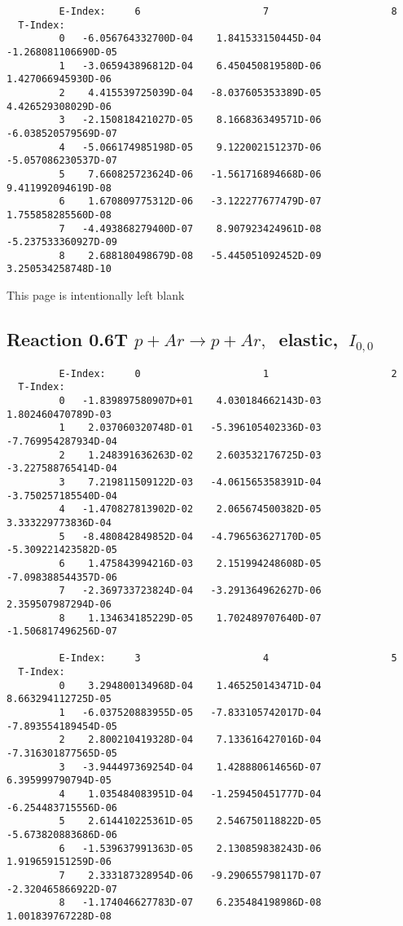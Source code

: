 \documentclass[12pt,dvipdfmx]{article}
\begin{document}
{\begin{small}
\begin{verbatim}
         E-Index:     6                     7                     8
  T-Index:
         0   -6.056764332700D-04    1.841533150445D-04   -1.268081106690D-05
         1   -3.065943896812D-04    6.450450819580D-06    1.427066945930D-06
         2    4.415539725039D-04   -8.037605353389D-05    4.426529308029D-06
         3   -2.150818421027D-05    8.166836349571D-06   -6.038520579569D-07
         4   -5.066174985198D-05    9.122002151237D-06   -5.057086230537D-07
         5    7.660825723624D-06   -1.561716894668D-06    9.411992094619D-08
         6    1.670809775312D-06   -3.122277677479D-07    1.755858285560D-08
         7   -4.493868279400D-07    8.907923424961D-08   -5.237533360927D-09
         8    2.688180498679D-08   -5.445051092452D-09    3.250534258748D-10

\end{verbatim}\end{small}
\newpage
This page is intentionally left blank
\newpage


\subsection{
Reaction 0.6T  $p + Ar \rightarrow p + Ar ,\ $
 elastic, $\  I_{0,0}$
}

\begin{small}\begin{verbatim}
         E-Index:     0                     1                     2
  T-Index:
         0   -1.839897580907D+01    4.030184662143D-03    1.802460470789D-03
         1    2.037060320748D-01   -5.396105402336D-03   -7.769954287934D-04
         2    1.248391636263D-02    2.603532176725D-03   -3.227588765414D-04
         3    7.219811509122D-03   -4.061565358391D-04   -3.750257185540D-04
         4   -1.470827813902D-02    2.065674500382D-05    3.333229773836D-04
         5   -8.480842849852D-04   -4.796563627170D-05   -5.309221423582D-05
         6    1.475843994216D-03    2.151994248608D-05   -7.098388544357D-06
         7   -2.369733723824D-04   -3.291364962627D-06    2.359507987294D-06
         8    1.134634185229D-05    1.702489707640D-07   -1.506817496256D-07

         E-Index:     3                     4                     5
  T-Index:
         0    3.294800134968D-04    1.465250143471D-04    8.663294112725D-05
         1   -6.037520883955D-05   -7.833105742017D-04   -7.893554189454D-05
         2    2.800210419328D-04    7.133616427016D-04   -7.316301877565D-05
         3   -3.944497369254D-04    1.428880614656D-07    6.395999790794D-05
         4    1.035484083951D-04   -1.259450451777D-04   -6.254483715556D-06
         5    2.614410225361D-05    2.546750118822D-05   -5.673820883686D-06
         6   -1.539637991363D-05    2.130859838243D-06    1.919659151259D-06
         7    2.333187328954D-06   -9.290655798117D-07   -2.320465866922D-07
         8   -1.174046627783D-07    6.235484198986D-08    1.001839767228D-08


\end{verbatim}
\end{small}}
\end{document}
